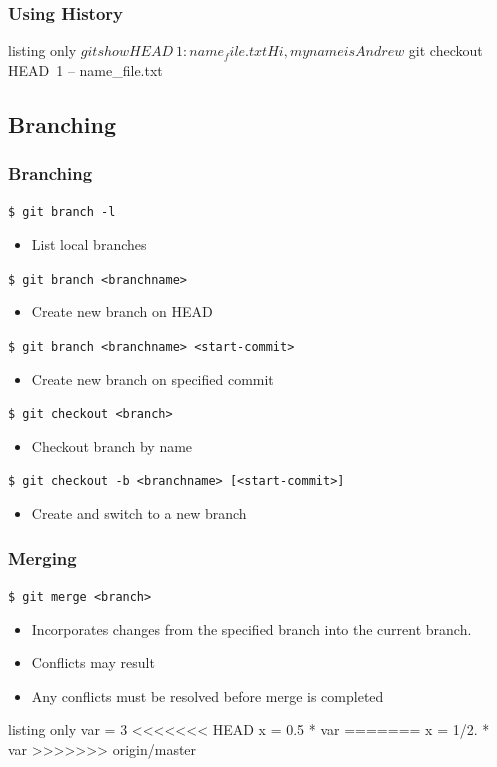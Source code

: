 \documentclass[english,compress]{beamer}
\begin{document}
\begin{frame}[fragile]
    \frametitle{Using History}
    \begin{tcblisting}{listing only}
$ git show HEAD~1:name_file.txt 
Hi, my name is Andrew
$ git checkout HEAD~1 -- name_file.txt
    \end{tcblisting}
\end{frame}

\subsection{Branching}
\begin{frame}[fragile]
    \frametitle{Branching}

    \verb|$ git branch -l|
    \begin{itemize}
        \item List local branches
    \end{itemize}

    \verb|$ git branch <branchname> |
    \begin{itemize}
        \item Create new branch on HEAD
    \end{itemize}

    \verb|$ git branch <branchname> <start-commit>|
    \begin{itemize}
        \item Create new branch on specified commit
    \end{itemize}

    \verb|$ git checkout <branch>|
    \begin{itemize}
        \item Checkout branch by name
    \end{itemize}

    \verb|$ git checkout -b <branchname> [<start-commit>]|
    \begin{itemize}
        \item Create and switch to a new branch
    \end{itemize}
\end{frame}

\begin{frame}[fragile]
    \frametitle{Merging}

    \verb|$ git merge <branch>|
    \begin{itemize}
        \item Incorporates changes from the specified branch into the current
            branch.
        \item Conflicts may result
        \item Any conflicts must be resolved before merge is completed
    \end{itemize}

    \begin{tcblisting}{listing only}
var = 3
<<<<<<< HEAD
x = 0.5 * var
=======
x = 1/2. * var
>>>>>>> origin/master
    \end{tcblisting}
\end{frame}
\end{document}
